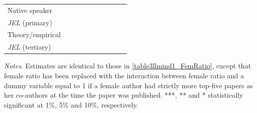 \begin{table}
\begin{threeparttable}
\begin{tabular}{p{4.5cm}S@{}S@{}S@{}S@{}S@{}S@{}S@{}S@{}S@{}}
            Native speaker                &               &               &               &               &           {}   &           {}   &           {}   &           {}   &           {}   \\
            \textit{JEL} (primary)        &               &               &               &               &               &               &           {}   &               &               \\
            Theory/empirical              &               &               &               &               &               &               &               &           {}   &               \\
            \textit{JEL} (tertiary)       &               &               &               &               &               &               &               &               &           {}   \\
            \bottomrule
        \end{tabular}
        \begin{tablenotes}
            \tiny
            \item \textit{Notes}. Estimates are identical to those in \autoref{table3llmind1_FemRatio}, except that female ratio has been replaced with the interaction between female ratio and a dummy variable equal to 1 if a female author had strictly more top-five papers as her co-authors at the time the paper was published. ***, ** and * statistically significant at 1\%, 5\% and 10\%, respectively.
        \end{tablenotes}
    \end{threeparttable}

\end{table}

